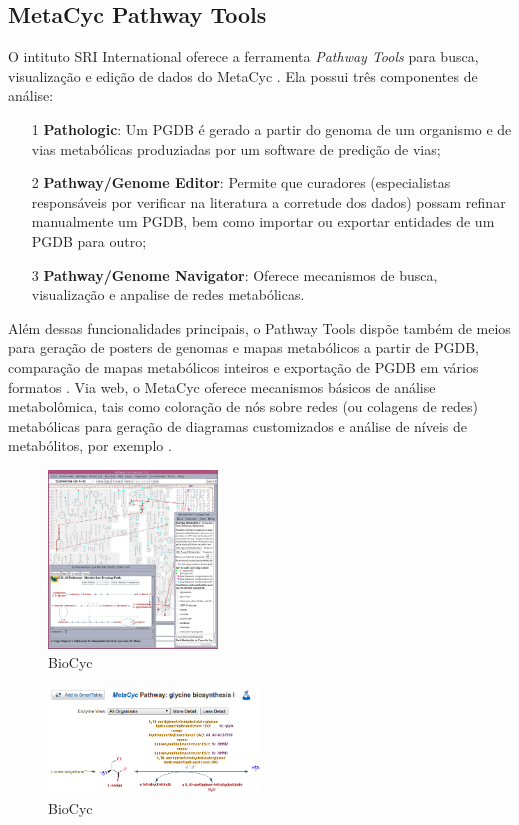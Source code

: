 \documentclass[conference]{IEEEtran}
\begin{document}
\subsection{MetaCyc Pathway Tools}

O intituto SRI International oferece a ferramenta \textit{Pathway Tools} para busca, visualização e edição de dados do MetaCyc \cite{articleMetacyc}. Ela possui três componentes de análise:
\begin{itemize}
\item[1]\textbf{Pathologic}: Um PGDB é gerado a partir do genoma de um organismo e de vias metabólicas produziadas por um software de predição de vias; 
\item[2]\textbf{Pathway/Genome Editor}: Permite que curadores (especialistas responsáveis por verificar na literatura a corretude dos dados) possam refinar manualmente um PGDB, bem como importar ou exportar entidades de um PGDB para outro;
\item[3]\textbf{Pathway/Genome Navigator}: Oferece mecanismos de busca, visualização e anpalise de redes metabólicas.
\end{itemize}
\indent Além dessas funcionalidades principais, o Pathway Tools dispõe também de meios para geração de posters de genomas e mapas metabólicos a partir de PGDB, comparação de mapas metabólicos inteiros e exportação de PGDB em vários formatos \cite{MetacycDesktopVsWeb}. Via web, o MetaCyc oferece mecanismos básicos de análise metabolômica, tais como coloração de nós sobre redes (ou colagens de redes) metabólicas para geração de diagramas customizados e análise de níveis de metabólitos, por exemplo \cite{MetacycOmicAnalysis}.

\begin{figure}[!t]
\centering
\includegraphics[width=0.4\textwidth]{biocyc-pathwaytool-desktop.png}
\caption{BioCyc}
\label{metacyc_arvore}
\end{figure}


\begin{figure}[!t]
\centering
\includegraphics[width=0.5\textwidth]{metacyc_glycin_small.png}
\caption{BioCyc}
\label{metacyc_glycin_small}
\end{figure}
\end{document}
